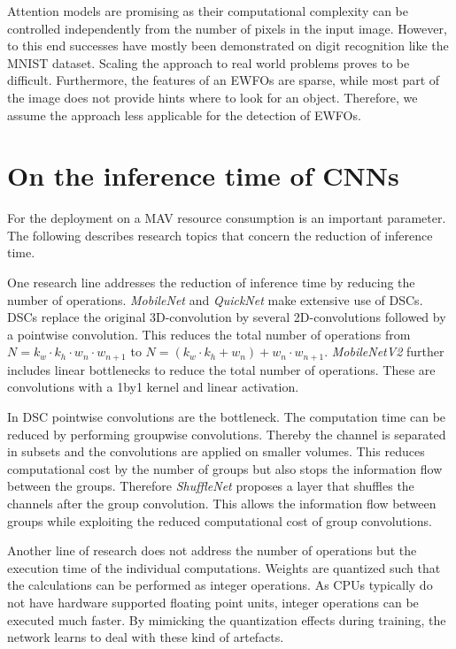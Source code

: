 Attention models are promising as their computational complexity can be controlled independently from the number of pixels in the input image. However, to this end successes have mostly been demonstrated on digit recognition like the MNIST dataset. Scaling the approach to real world problems proves to be difficult. Furthermore, the features of an \acp{EWFO} are sparse, while most part of the image does not provide hints where to look for an object. Therefore, we assume the approach less applicable for the detection of \acp{EWFO}.

\section{On the inference time of \acp{CNN}}

For the deployment on a \ac{MAV} resource consumption is an important parameter. The following describes research topics that concern the reduction of inference time.

One research line addresses the reduction of inference time by reducing the number of operations. \textit{MobileNet} \cite{Howard2017} and \textit{QuickNet} \cite{Ghosh2017} make extensive use of \acp{DSC}. \acp{DSC} replace the original 3D-convolution by several 2D-convolutions followed by a pointwise convolution. This reduces the total number of operations from $N = k_w \cdot k_h \cdot w_n \cdot w_{n+1}$ to $N=(k_w \cdot k_h + w_n)+w_n \cdot w_{n+1}$. \textit{MobileNetV2} \cite{Sandler2018} further includes linear bottlenecks to reduce the total number of operations. These are convolutions with a 1by1 kernel and linear activation.

In \ac{DSC} pointwise convolutions are the bottleneck. The computation time can be reduced by performing groupwise convolutions. Thereby the channel is separated in subsets and the convolutions are applied on smaller volumes. This reduces computational cost by the number of groups but also stops the information flow between the groups. Therefore \textit{ShuffleNet}\cite{Zhang2017a} proposes a layer that shuffles the channels after the group convolution. This allows the information flow between groups while exploiting the reduced computational cost of group convolutions.

Another line of research does not address the number of operations but the execution time of the individual computations. Weights are quantized such that the calculations can be performed as integer operations. As \acp{CPU} typically do not have hardware supported floating point units, integer operations can be executed much faster. By mimicking the quantization effects during training, the network learns to deal with these kind of artefacts. 

